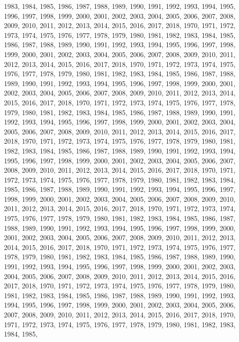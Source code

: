 \documentclass[
]{article}
\begin{document}
1983, 1984, 1985, 1986, 1987, 1988, 1989, 1990, 1991, 1992, 1993, 1994,
1995, 1996, 1997, 1998, 1999, 2000, 2001, 2002, 2003, 2004, 2005, 2006,
2007, 2008, 2009, 2010, 2011, 2012, 2013, 2014, 2015, 2016, 2017, 2018,
1970, 1971, 1972, 1973, 1974, 1975, 1976, 1977, 1978, 1979, 1980, 1981,
1982, 1983, 1984, 1985, 1986, 1987, 1988, 1989, 1990, 1991, 1992, 1993,
1994, 1995, 1996, 1997, 1998, 1999, 2000, 2001, 2002, 2003, 2004, 2005,
2006, 2007, 2008, 2009, 2010, 2011, 2012, 2013, 2014, 2015, 2016, 2017,
2018, 1970, 1971, 1972, 1973, 1974, 1975, 1976, 1977, 1978, 1979, 1980,
1981, 1982, 1983, 1984, 1985, 1986, 1987, 1988, 1989, 1990, 1991, 1992,
1993, 1994, 1995, 1996, 1997, 1998, 1999, 2000, 2001, 2002, 2003, 2004,
2005, 2006, 2007, 2008, 2009, 2010, 2011, 2012, 2013, 2014, 2015, 2016,
2017, 2018, 1970, 1971, 1972, 1973, 1974, 1975, 1976, 1977, 1978, 1979,
1980, 1981, 1982, 1983, 1984, 1985, 1986, 1987, 1988, 1989, 1990, 1991,
1992, 1993, 1994, 1995, 1996, 1997, 1998, 1999, 2000, 2001, 2002, 2003,
2004, 2005, 2006, 2007, 2008, 2009, 2010, 2011, 2012, 2013, 2014, 2015,
2016, 2017, 2018, 1970, 1971, 1972, 1973, 1974, 1975, 1976, 1977, 1978,
1979, 1980, 1981, 1982, 1983, 1984, 1985, 1986, 1987, 1988, 1989, 1990,
1991, 1992, 1993, 1994, 1995, 1996, 1997, 1998, 1999, 2000, 2001, 2002,
2003, 2004, 2005, 2006, 2007, 2008, 2009, 2010, 2011, 2012, 2013, 2014,
2015, 2016, 2017, 2018, 1970, 1971, 1972, 1973, 1974, 1975, 1976, 1977,
1978, 1979, 1980, 1981, 1982, 1983, 1984, 1985, 1986, 1987, 1988, 1989,
1990, 1991, 1992, 1993, 1994, 1995, 1996, 1997, 1998, 1999, 2000, 2001,
2002, 2003, 2004, 2005, 2006, 2007, 2008, 2009, 2010, 2011, 2012, 2013,
2014, 2015, 2016, 2017, 2018, 1970, 1971, 1972, 1973, 1974, 1975, 1976,
1977, 1978, 1979, 1980, 1981, 1982, 1983, 1984, 1985, 1986, 1987, 1988,
1989, 1990, 1991, 1992, 1993, 1994, 1995, 1996, 1997, 1998, 1999, 2000,
2001, 2002, 2003, 2004, 2005, 2006, 2007, 2008, 2009, 2010, 2011, 2012,
2013, 2014, 2015, 2016, 2017, 2018, 1970, 1971, 1972, 1973, 1974, 1975,
1976, 1977, 1978, 1979, 1980, 1981, 1982, 1983, 1984, 1985, 1986, 1987,
1988, 1989, 1990, 1991, 1992, 1993, 1994, 1995, 1996, 1997, 1998, 1999,
2000, 2001, 2002, 2003, 2004, 2005, 2006, 2007, 2008, 2009, 2010, 2011,
2012, 2013, 2014, 2015, 2016, 2017, 2018, 1970, 1971, 1972, 1973, 1974,
1975, 1976, 1977, 1978, 1979, 1980, 1981, 1982, 1983, 1984, 1985, 1986,
1987, 1988, 1989, 1990, 1991, 1992, 1993, 1994, 1995, 1996, 1997, 1998,
1999, 2000, 2001, 2002, 2003, 2004, 2005, 2006, 2007, 2008, 2009, 2010,
2011, 2012, 2013, 2014, 2015, 2016, 2017, 2018, 1970, 1971, 1972, 1973,
1974, 1975, 1976, 1977, 1978, 1979, 1980, 1981, 1982, 1983, 1984, 1985,
\end{document}
